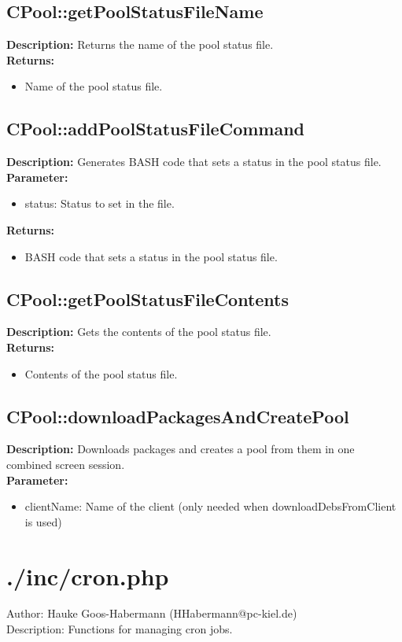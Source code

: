 \subsection{CPool::getPoolStatusFileName}
\textbf{Description:} Returns the name of the pool status file.\\
\textbf{Returns:}
\begin{itemize}
\item Name of the pool status file.
\end{itemize}

\subsection{CPool::addPoolStatusFileCommand}
\textbf{Description:} Generates BASH code that sets a status in the pool status file.\\
\textbf{Parameter:}
\begin{itemize}
\item status: Status to set in the file.
\end{itemize}
\textbf{Returns:}
\begin{itemize}
\item BASH code that sets a status in the pool status file.
\end{itemize}

\subsection{CPool::getPoolStatusFileContents}
\textbf{Description:} Gets the contents of the pool status file.\\
\textbf{Returns:}
\begin{itemize}
\item Contents of the pool status file.
\end{itemize}

\subsection{CPool::downloadPackagesAndCreatePool}
\textbf{Description:} Downloads packages and creates a pool from them in one combined screen session.\\
\textbf{Parameter:}
\begin{itemize}
\item clientName: Name of the client (only needed when downloadDebsFromClient is used)
\end{itemize}

\newpage\section{./inc/cron.php}
 Author: Hauke Goos-Habermann (HHabermann@pc-kiel.de)\\
 Description: Functions for managing cron jobs.\\

